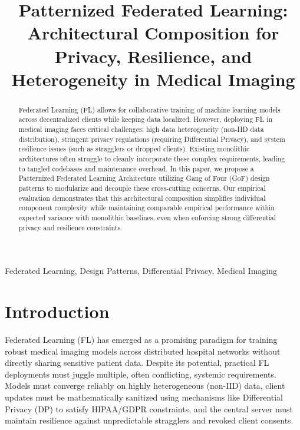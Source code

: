 \documentclass[10pt, conference]{IEEEtran}
\begin{document}
\title{Patternized Federated Learning: Architectural Composition for Privacy, Resilience, and Heterogeneity in Medical Imaging}

\author{
}

\maketitle

\begin{abstract}
Federated Learning (FL) allows for collaborative training of machine learning models across decentralized clients while keeping data localized. However, deploying FL in medical imaging faces critical challenges: high data heterogeneity (non-IID data distribution), stringent privacy regulations (requiring Differential Privacy), and system resilience issues (such as stragglers or dropped clients). Existing monolithic architectures often struggle to cleanly incorporate these complex requirements, leading to tangled codebases and maintenance overhead. In this paper, we propose a Patternized Federated Learning Architecture utilizing Gang of Four (GoF) design patterns to modularize and decouple these cross-cutting concerns. Our empirical evaluation demonstrates that this architectural composition simplifies individual component complexity while maintaining comparable empirical performance within expected variance with monolithic baselines, even when enforcing strong differential privacy and resilience constraints.
\end{abstract}

\begin{IEEEkeywords}
Federated Learning, Design Patterns, Differential Privacy, Medical Imaging
\end{IEEEkeywords}

\section{Introduction}
Federated Learning (FL) has emerged as a promising paradigm for training robust medical imaging models across distributed hospital networks without directly sharing sensitive patient data. Despite its potential, practical FL deployments must juggle multiple, often conflicting, systemic requirements. Models must converge reliably on highly heterogeneous (non-IID) data, client updates must be mathematically sanitized using mechanisms like Differential Privacy (DP) to satisfy HIPAA/GDPR constraints, and the central server must maintain resilience against unpredictable stragglers and revoked client consents.
\end{document}
